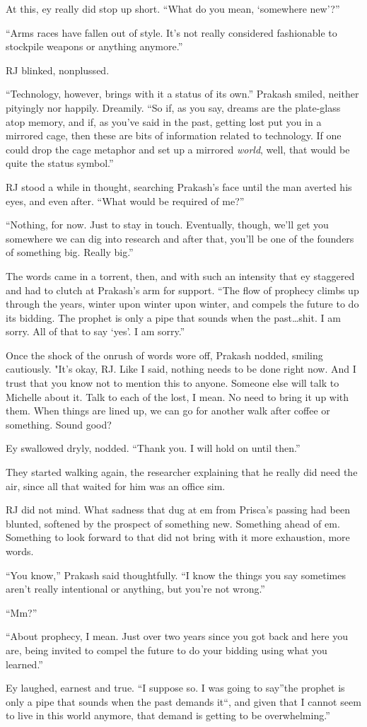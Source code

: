 At this, ey really did stop up short. ``What do you mean, `somewhere new'?''

``Arms races have fallen out of style. It's not really considered fashionable to stockpile weapons or anything anymore.''

RJ blinked, nonplussed.

``Technology, however, brings with it a status of its own.'' Prakash smiled, neither pityingly nor happily. Dreamily. ``So if, as you say, dreams are the plate-glass atop memory, and if, as you've said in the past, getting lost put you in a mirrored cage, then these are bits of information related to technology. If one could drop the cage metaphor and set up a mirrored \emph{world}, well, that would be quite the status symbol.''

RJ stood a while in thought, searching Prakash's face until the man averted his eyes, and even after. ``What would be required of me?''

``Nothing, for now. Just to stay in touch. Eventually, though, we'll get you somewhere we can dig into research and after that, you'll be one of the founders of something big. Really big.''

The words came in a torrent, then, and with such an intensity that ey staggered and had to clutch at Prakash's arm for support. ``The flow of prophecy climbs up through the years, winter upon winter upon winter, and compels the future to do its bidding. The prophet is only a pipe that sounds when the past\ldots shit. I am sorry. All of that to say `yes'. I am sorry.''

Once the shock of the onrush of words wore off, Prakash nodded, smiling cautiously. "It's okay, RJ. Like I said, nothing needs to be done right now. And I trust that you know not to mention this to anyone. Someone else will talk to Michelle about it. Talk to each of the lost, I mean. No need to bring it up with them. When things are lined up, we can go for another walk after coffee or something. Sound good?

Ey swallowed dryly, nodded. ``Thank you. I will hold on until then.''

They started walking again, the researcher explaining that he really did need the air, since all that waited for him was an office sim.

RJ did not mind. What sadness that dug at em from Prisca's passing had been blunted, softened by the prospect of something new. Something ahead of em. Something to look forward to that did not bring with it more exhaustion, more words.

``You know,'' Prakash said thoughtfully. ``I know the things you say sometimes aren't really intentional or anything, but you're not wrong.''

``Mm?''

``About prophecy, I mean. Just over two years since you got back and here you are, being invited to compel the future to do your bidding using what you learned.''

Ey laughed, earnest and true. ``I suppose so. I was going to say''the prophet is only a pipe that sounds when the past demands it``, and given that I cannot seem to live in this world anymore, that demand is getting to be overwhelming.''
